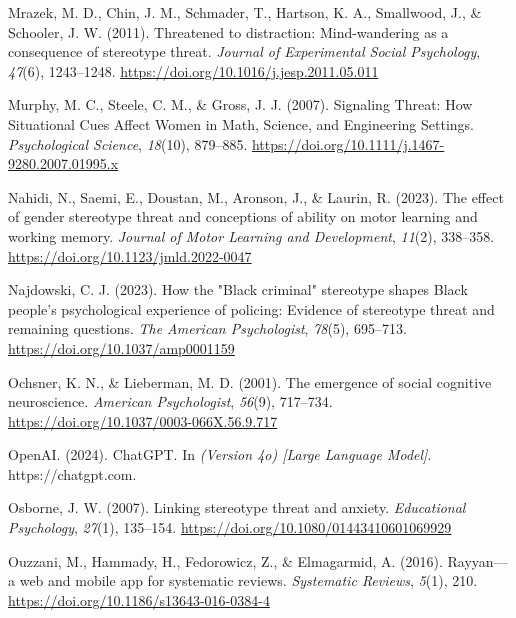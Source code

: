 \documentclass[
  stu, a4paper, 12pt,mask,floatsintext]{apa7}
\newlength{\cslhangindent}
\newenvironment{CSLReferences}[2] %
 {\begin{list}{}{%
  \setlength{\itemindent}{0pt}
  \setlength{\leftmargin}{0pt}
  \setlength{\parsep}{0pt}
  \ifodd #1
   \setlength{\leftmargin}{\cslhangindent}
   \setlength{\itemindent}{-1\cslhangindent}
  \fi
  \setlength{\itemsep}{#2\baselineskip}}}
 {\end{list}}
\begin{document}
\begin{CSLReferences}{1}{0}
Mrazek, M. D., Chin, J. M., Schmader, T., Hartson, K. A., Smallwood, J., \& Schooler, J. W. (2011). Threatened to distraction: {Mind-wandering} as a consequence of stereotype threat. \emph{Journal of Experimental Social Psychology}, \emph{47}(6), 1243--1248. \url{https://doi.org/10.1016/j.jesp.2011.05.011}

Murphy, M. C., Steele, C. M., \& Gross, J. J. (2007). Signaling {Threat}: {How Situational Cues Affect Women} in {Math}, {Science}, and {Engineering Settings}. \emph{Psychological Science}, \emph{18}(10), 879--885. \url{https://doi.org/10.1111/j.1467-9280.2007.01995.x}

Nahidi, N., Saemi, E., Doustan, M., Aronson, J., \& Laurin, R. (2023). The effect of gender stereotype threat and conceptions of ability on motor learning and working memory. \emph{Journal of Motor Learning and Development}, \emph{11}(2), 338--358. \url{https://doi.org/10.1123/jmld.2022-0047}

Najdowski, C. J. (2023). How the "{Black} criminal" stereotype shapes {Black} people's psychological experience of policing: {Evidence} of stereotype threat and remaining questions. \emph{The American Psychologist}, \emph{78}(5), 695--713. \url{https://doi.org/10.1037/amp0001159}

Ochsner, K. N., \& Lieberman, M. D. (2001). The emergence of social cognitive neuroscience. \emph{American Psychologist}, \emph{56}(9), 717--734. \url{https://doi.org/10.1037/0003-066X.56.9.717}

OpenAI. (2024). {ChatGPT}. In \emph{(Version 4o) {[}Large Language Model{]}}. https://chatgpt.com.

Osborne, J. W. (2007). Linking stereotype threat and anxiety. \emph{Educational Psychology}, \emph{27}(1), 135--154. \url{https://doi.org/10.1080/01443410601069929}

Ouzzani, M., Hammady, H., Fedorowicz, Z., \& Elmagarmid, A. (2016). Rayyan---a web and mobile app for systematic reviews. \emph{Systematic Reviews}, \emph{5}(1), 210. \url{https://doi.org/10.1186/s13643-016-0384-4}


\end{CSLReferences}
\end{document}
